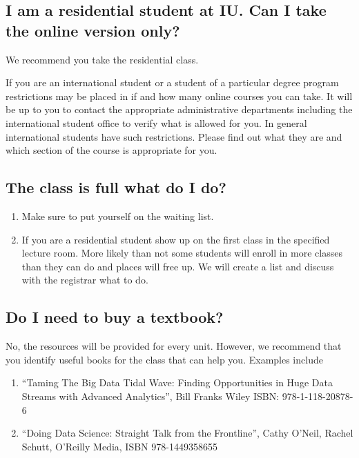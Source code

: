 \subsection{I am a residential student at IU. Can I take the online version only?}
\label{\detokenize{faq:i-am-a-residential-student-at-iu-can-i-take-the-online-version-only}}
We recommend you take the residential class.

If you are an international student or a student of a particular
degree program restrictions may be placed in if and how many online
courses you can take. It will be up to you to contact the appropriate
administrative departments including the international student office
to verify what is allowed for you. In general international students
have such restrictions. Please find out what they are and which
section of the course is appropriate for you.


\subsection{The class is full what do I do?}
\label{\detokenize{faq:the-class-is-full-what-do-i-do}}\begin{enumerate}
\item {} 
Make sure to put yourself on the waiting list.

\item {} 
If you are a residential student show up on the first class in the
specified lecture room. More likely than not some students will
enroll in more classes than they can do and places will free up. We
will create a list and discuss with the registrar what to do.

\end{enumerate}


\subsection{Do I need to buy a textbook?}
\label{\detokenize{faq:do-i-need-to-buy-a-textbook}}
No, the resources will be provided for every unit. However, we
recommend that you identify useful books for the class that can help
you. Examples include
\begin{enumerate}
\item {} 
“Taming The Big Data Tidal Wave: Finding Opportunities in Huge Data
Streams with Advanced Analytics”, Bill Franks Wiley ISBN:
978-1-118-20878-6

\item {} 
“Doing Data Science: Straight Talk from the Frontline”, Cathy O'Neil,
Rachel Schutt, O'Reilly Media, ISBN 978-1449358655

\end{enumerate}

